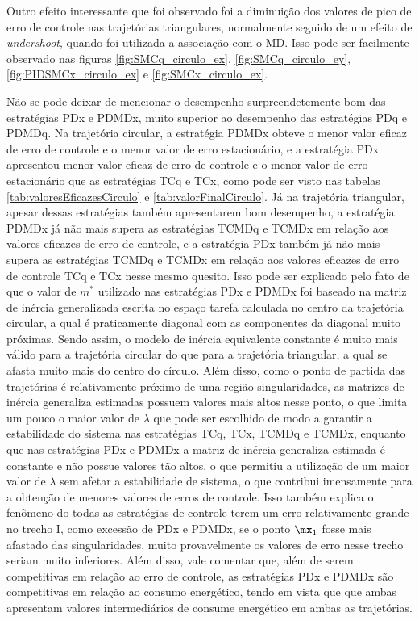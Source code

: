 \documentclass[]{politex}
\begin{document}
Outro efeito interessante que foi observado foi a diminuição dos valores de pico de erro de controle nas trajetórias triangulares, normalmente seguido de um efeito de \emph{undershoot}, quando foi utilizada a associação com o MD. Isso pode ser facilmente observado nas figuras \ref{fig:SMCq_circulo_ex}, \ref{fig:SMCq_circulo_ey}, \ref{fig:PIDSMCx_circulo_ex} e \ref{fig:SMCx_circulo_ex}.

Não se pode deixar de mencionar o desempenho surpreendetemente bom das estratégias PDx e PDMDx, muito superior ao desempenho das estratégias PDq e PDMDq. Na trajetória circular, a estratégia PDMDx obteve o menor valor eficaz de erro de controle e o menor valor de erro estacionário, e a estratégia PDx apresentou menor valor eficaz de erro de controle e o menor valor de erro estacionário que as estratégias TCq e TCx, como pode ser visto nas tabelas \ref{tab:valoresEficazesCirculo} e \ref{tab:valorFinalCirculo}. Já na trajetória triangular, apesar dessas estratégias também apresentarem bom desempenho, a estratégia PDMDx já não mais supera as estratégias TCMDq e TCMDx em relação aos valores eficazes de erro de controle, e a estratégia PDx também já não mais supera as estratégias TCMDq e TCMDx em relação aos valores eficazes de erro de controle TCq e TCx nesse mesmo quesito. Isso pode ser explicado pelo fato de que o valor de $m^*$ utilizado nas estratégias PDx e PDMDx foi baseado na matriz de inércia generalizada escrita no espaço tarefa calculada no centro da trajetória circular, a qual é praticamente diagonal com as componentes da diagonal muito próximas. Sendo assim, o modelo de inércia equivalente constante é muito mais válido para a trajetória circular do que para a trajetória triangular, a qual se afasta muito mais do centro do círculo. Além disso, como o ponto de partida das trajetórias é relativamente próximo de uma região singularidades, as matrizes de inércia generaliza estimadas possuem valores mais altos nesse ponto, o que limita um pouco o maior valor de $\lambda$ que pode ser escolhido de modo a garantir a estabilidade do sistema nas estratégias TCq, TCx, TCMDq e TCMDx, enquanto que nas estratégias PDx e PDMDx a matriz de inércia generaliza estimada é constante e não possue valores tão altos, o que permitiu a utilização de um maior valor de $\lambda$ sem afetar a estabilidade de sistema, o que contribui imensamente para a obtenção de menores valores de erros de controle. Isso também explica o fenômeno do todas as estratégias de controle terem um erro relativamente grande no trecho I, como excessão de PDx e PDMDx, se o ponto $\mx_1$ fosse mais afastado das singularidades, muito provavelmente os valores de erro nesse trecho seriam muito inferiores. Além disso, vale comentar que, além de serem competitivas em relação ao erro de controle, as estratégias PDx e PDMDx são competitivas em relação ao consumo energético, tendo em vista que que ambas apresentam valores intermediários de consume energético em ambas as trajetórias.
\end{document}
